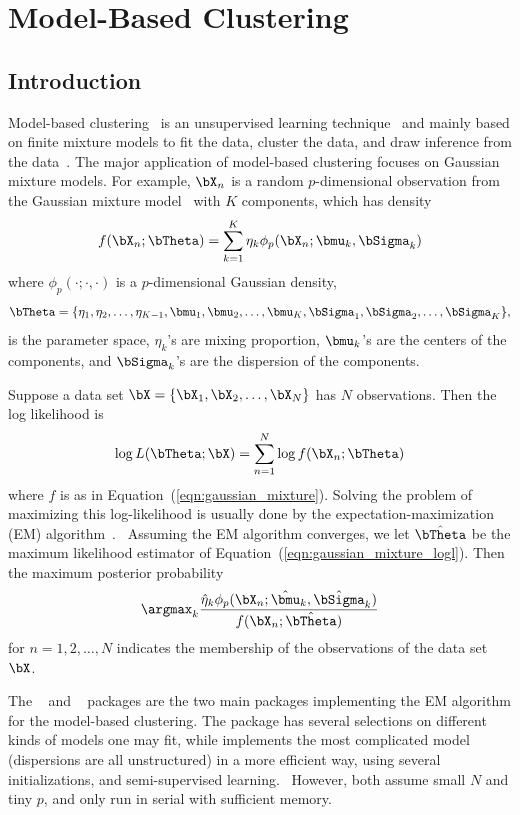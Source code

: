 
\chapter{Model-Based Clustering}
\label{chp:pmclust}

\section{Introduction}

Model-based clustering~
is an unsupervised learning technique~
and mainly based on finite mixture models to fit the data, cluster the data,
and draw inference from the data~\citep{Fraley2002,Melnykov2010}.
The major application of
model-based clustering focuses on Gaussian mixture models. For example,
$\bX_n$ is a random $p$-dimensional observation from
the Gaussian mixture model~
with $K$ components, which has density
\begin{equation}
f(\bX_n; \bTheta) = \sum_{k = 1}^K \eta_k \phi_p(\bX_n; \bmu_k, \bSigma_k)
\label{eqn:gaussian_mixture}
\end{equation}
where $\phi_p(\cdot;\cdot,\cdot)$ is a $p$-dimensional Gaussian density,
$$
\bTheta = \{\eta_1, \eta_2, \ldots, \eta_{K-1},
\bmu_1, \bmu_2, \ldots, \bmu_K, \bSigma_1, \bSigma_2, \ldots, \bSigma_K\},
$$
is the parameter space,
$\eta_k$'s are mixing proportion, $\bmu_k$'s are the centers of the components,
and $\bSigma_k$'s are the dispersion of the components.

Suppose a data set $\bX = \{\bX_1, \bX_2, \ldots, \bX_N\}$ has
$N$ observations.  Then the log likelihood is
\begin{equation}
\log L(\bTheta; \bX) = \sum_{n = 1}^N \log f(\bX_n; \bTheta)
\label{eqn:gaussian_mixture_logl}
\end{equation}
where $f$ is as in Equation~(\ref{eqn:gaussian_mixture}).
Solving the problem of maximizing this log-likelihood is usually done by the
expectation-maximization (EM)
algorithm~\citep{Dempster1977}.~
Assuming the EM algorithm converges, we let $\hat{\bTheta}$ be the
maximum likelihood estimator of Equation~(\ref{eqn:gaussian_mixture_logl}).
Then the maximum posterior probability
$$
\argmax_k
\frac{\hat{\eta}_k\phi_p(\bX_n; \hat{\bmu}_k, \hat{\bSigma}_k)
    }{f(\bX_n; \hat{\bTheta})}
$$
for $n = 1, 2, \ldots, N$
indicates the membership of the observations of the data set $\bX$.


The ~\citep{mclust} and
~\citep{Chen2012EMClusterpackage}
packages are the two main  packages implementing the EM algorithm
for the model-based clustering.
The  package has several selections on different kinds of models
one may fit, while  
implements the most complicated model (dispersions are all unstructured)
in a more efficient way, using several initializations, and
semi-supervised learning.~
However, both assume small $N$ and tiny $p$, and only run in serial with
sufficient memory.

